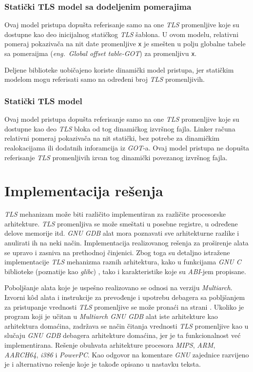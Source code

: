 \documentclass[12pt,oneside]{memoir}
\begin{document}
\subsection{Statički TLS model sa dodeljenim pomerajima}

Ovaj model pristupa dopušta referisanje samo na one \emph{TLS} promenljive koje su dostupne kao deo inicijalnog statičkog \emph{TLS} šablona. U ovom modelu, relativni pomeraj pokazivača na nit date promenljive \texttt{x} je smešten u polju globalne tabele sa pomeraijma (\emph{eng.~Global offset table-GOT}) za promenljivu \texttt{x}.

Deljene biblioteke uobičajeno koriste dinamički model pristupa, jer statičkim modelom mogu referisati samo na određeni broj \emph{TLS} promenljivih.

\subsection{Statički TLS model}

Ovaj model pristupa dopušta referisanje samo na one \emph{TLS} promenljive koje su dostupne kao deo \emph{TLS} bloka od tog dinamičkog izvršnog fajla. Linker računa relativni pomeraj pokazivača na nit statički, bez potrebe za dinamičkim realokacijama ili dodatnih inforamcija iz \emph{GOT}-a. Ovaj model pristupa ne dopušta referisanje \emph{TLS} promenljivih izvan tog dinamički povezanog izvršnog fajla.

\chapter{Implementacija rešenja}
\label{chp:Implementacija}

\emph{TLS} mehanizam može biti različito implementiran za različite procesorske arhitekture. \emph{TLS} promenljiva se može smeštati u posebne registre, u određene delove memorije itd. \emph{GNU GDB} alat mora poznavati sve arhitekturne razlike i anulirati ih na neki način. Implementacija realizovanog rešenja za proširenje alata se upravo i zasniva na prethodnoj činjenici. Zbog toga su detaljno istražene implementacije \emph{TLS} mehanizma raznih arhitektura, kako u funkcijama \emph{GNU C} biblioteke (poznatije kao \emph{glibc}) \cite{GLIBC}, tako i karakteristike koje su \emph{ABI}-jem propisane.

Poboljšanje alata koje je uspešno realizovano se odnosi na verziju \emph{Multiarch}. Izvorni k\^{o}d alata i instrukcije za prevođenje i upotrebu debagera sa pobljšanjem za pristupanje vrednosti \emph{TLS} promenljive se može pronaći na strani \cite{GITMOJ}. Ukoliko je program koji je učitan u \emph{Multiarch GNU GDB} alat iste arhitekture kao arhitektura domaćina, zadržava se način čitanja vrednosti \emph{TLS} promenljive kao u slučaju \emph{GNU GDB} debagera arhitekture domaćina, jer je ta funkcionalnost već implementirana. Rešenje obuhvata arhitekture procesora \emph{MIPS}, \emph{ARM}, \emph{AARCH64}, \emph{i386} i \emph{PowerPC}. Kao odgovor na komentare \emph{GNU} zajednice razvijeno je i alternativno rešenje koje je takođe opisano u nastavku teksta.
\end{document}
